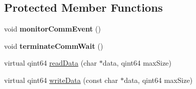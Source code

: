 \subsection*{Protected Member Functions}
\begin{DoxyCompactItemize}
\item 
\mbox{\label{class_win___qext_serial_port_a781024aa5d94eb958c95e2ac38c824f9}} 
void {\bfseries monitor\+Comm\+Event} ()
\item 
\mbox{\label{class_win___qext_serial_port_a58d984d53c0ade6e7000d47eaf3e5cf3}} 
void {\bfseries terminate\+Comm\+Wait} ()
\item 
virtual qint64 \mbox{\hyperlink{class_win___qext_serial_port_a39d6d73caac12dc1ca58d88b6e08dcb9}{read\+Data}} (char $\ast$data, qint64 max\+Size)
\item 
virtual qint64 \mbox{\hyperlink{class_win___qext_serial_port_abe7e2c0f77000edfcf814fccae66fcd9}{write\+Data}} (const char $\ast$data, qint64 max\+Size)
\end{DoxyCompactItemize}
